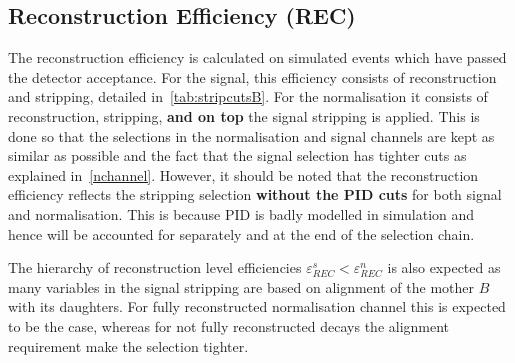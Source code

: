 
\subsection{Reconstruction Efficiency (REC)}
The reconstruction efficiency is calculated on simulated events which have passed the detector acceptance. For the signal, this efficiency consists of reconstruction and stripping, detailed in~\autoref{tab:stripcutsB}. For the normalisation it consists of reconstruction, stripping, \textbf{and on top} the signal stripping is applied. This is done so that the selections in the normalisation and signal channels are kept as similar as possible and the fact that the signal selection has tighter cuts as explained in~\autoref{nchannel}. However, it should be noted that the reconstruction efficiency reflects the stripping selection \textbf{without the PID cuts} for both signal and normalisation. This is because \gls{PID} is badly modelled in simulation and hence will be accounted for separately and at the end of the selection chain.

The hierarchy of reconstruction level efficiencies $\varepsilon^{s}_{REC} < \varepsilon^{n}_{REC}$ is also expected as many variables in the signal stripping are based on alignment of the mother $B$ with its daughters. For fully reconstructed normalisation channel this is expected to be the case, whereas for not fully reconstructed decays the alignment requirement make the selection tighter. 

